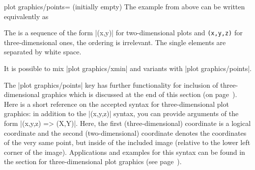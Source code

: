 {{\begin{pgfplotskey}{plot graphics/points= (initially empty)}
    The example from above can be written equivalently as
\begin{codeexample}[]
\end{codeexample}
    \noindent The  is a sequence of the form |(x,y)|
    for two-dimensional plots and \texttt{(x,y,z)} for three-dimensional ones,
    the ordering is irrelevant. The single elements are separated by white
    space.

    It is possible to mix |plot graphics/xmin| and variants with
    |plot graphics/points|.

    The |plot graphics/points| key has further functionality for inclusion of
    three-dimensional graphics which is discussed at the end of this section
    (on page~\pageref{sec:plotgraphics3d}). Here is a short reference on the
    accepted syntax for three-dimensional plot graphics: in addition to the
    |(x,y,z)| syntax, you can provide arguments of the form |(x,y,z) => (X,Y)|.
    Here, the first (three-dimensional) coordinate is a logical coordinate and
    the second (two-dimensional) coordinate denotes the coordinates of the very
    same point, but inside of the included image (relative to the lower left
    corner of the image). Applications and examples for this syntax can be
    found in the section for three-dimensional plot graphics (see
    page~\pageref{sec:plotgraphics3d}).
\end{pgfplotskey}


}}
